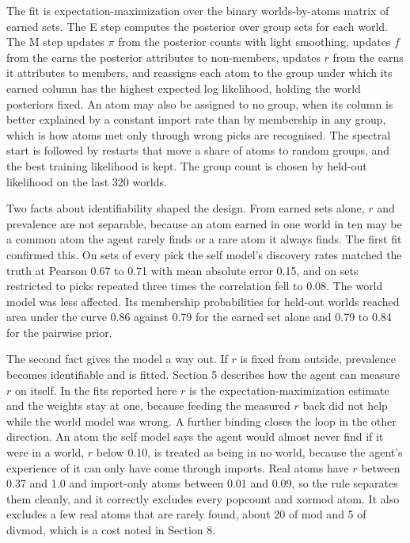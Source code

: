 \documentclass[11pt]{article}
\begin{document}
The fit is expectation-maximization over the binary worlds-by-atoms matrix of earned sets. The E step computes the posterior over group sets for each world. The M step updates $\pi$ from the posterior counts with light smoothing, updates $f$ from the earns the posterior attributes to non-members, updates $r$ from the earns it attributes to members, and reassigns each atom to the group under which its earned column has the highest expected log likelihood, holding the world posteriors fixed. An atom may also be assigned to no group, when its column is better explained by a constant import rate than by membership in any group, which is how atoms met only through wrong picks are recognised. The spectral start is followed by restarts that move a share of atoms to random groups, and the best training likelihood is kept. The group count is chosen by held-out likelihood on the last 320 worlds.

Two facts about identifiability shaped the design. From earned sets alone, $r$ and prevalence are not separable, because an atom earned in one world in ten may be a common atom the agent rarely finds or a rare atom it always finds. The first fit confirmed this. On sets of every pick the self model's discovery rates matched the truth at Pearson 0.67 to 0.71 with mean absolute error 0.15, and on sets restricted to picks repeated three times the correlation fell to 0.08. The world model was less affected. Its membership probabilities for held-out worlds reached area under the curve 0.86 against 0.79 for the earned set alone and 0.79 to 0.84 for the pairwise prior.

The second fact gives the model a way out. If $r$ is fixed from outside, prevalence becomes identifiable and is fitted. Section 5 describes how the agent can measure $r$ on itself. In the fits reported here $r$ is the expectation-maximization estimate and the weights stay at one, because feeding the measured $r$ back did not help while the world model was wrong. A further binding closes the loop in the other direction. An atom the self model says the agent would almost never find if it were in a world, $r$ below 0.10, is treated as being in no world, because the agent's experience of it can only have come through imports. Real atoms have $r$ between 0.37 and 1.0 and import-only atoms between 0.01 and 0.09, so the rule separates them cleanly, and it correctly excludes every popcount and xormod atom. It also excludes a few real atoms that are rarely found, about 20 of mod and 5 of divmod, which is a cost noted in Section 8.
\end{document}
